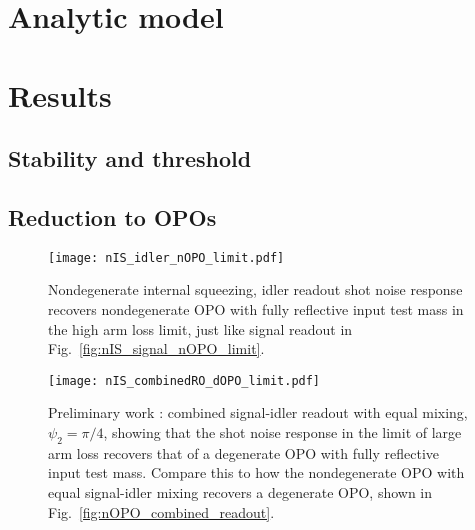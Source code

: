 \section{Analytic model}


\section{Results}

\subsection{Stability and threshold}



\subsection{Reduction to OPOs}


\begin{figure}
	\centering
	\texttt{[image: nIS\_idler\_nOPO\_limit.pdf]}
	\caption{  Nondegenerate internal squeezing, idler readout shot noise response recovers nondegenerate OPO with fully reflective input test mass in the high arm loss limit, just like signal readout in Fig.~\ref{fig:nIS_signal_nOPO_limit}.}
	\label{fig:}
\end{figure}

\begin{figure}
	\centering
	\texttt{[image: nIS\_combinedRO\_dOPO\_limit.pdf]}
	\caption{  Preliminary work : combined signal-idler readout with equal mixing, $\psi_2=\pi/4$, showing that the shot noise response in the limit of large arm loss recovers that of a degenerate OPO with fully reflective input test mass. Compare this to how the nondegenerate OPO with equal signal-idler mixing recovers a degenerate OPO, shown in Fig.~\ref{fig:nOPO_combined_readout}.}
	\label{fig:}
\end{figure}

